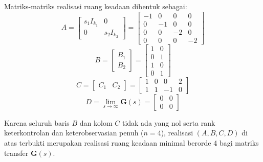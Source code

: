 \documentclass[11pt,a4paper]{article}
\begin{document}
Matriks-matriks realisasi ruang keadaan dibentuk sebagai:
$$A = \begin{bmatrix} s_1 I_{k_1} & 0 \\ 0 & s_2 I_{k_2} \end{bmatrix} = \begin{bmatrix} -1 & 0 & 0 & 0 \\ 0 & -1 & 0 & 0 \\ 0 & 0 & -2 & 0 \\ 0 & 0 & 0 & -2 \end{bmatrix}$$
$$B = \begin{bmatrix} B_1 \\ B_2 \end{bmatrix} = \begin{bmatrix} 1 & 0 \\ 0 & 1 \\ 1 & 0 \\ 0 & 1 \end{bmatrix}$$
$$C = \begin{bmatrix} C_1 & C_2 \end{bmatrix} = \begin{bmatrix} 1 & 0 & 0 & 2 \\ 1 & 1 & -1 & 0 \end{bmatrix}$$
$$D = \lim_{s \to \infty} \mathbf{G}(s) = \begin{bmatrix} 0 & 0 \\ 0 & 0 \end{bmatrix}$$

Karena seluruh baris $B$ dan kolom $C$ tidak ada yang nol serta rank keterkontrolan dan keterobservasian penuh ($n = 4$), realisasi $(A, B, C, D)$ di atas terbukti merupakan realisasi ruang keadaan minimal berorde 4 bagi matriks transfer $\mathbf{G}(s)$.
\end{document}
